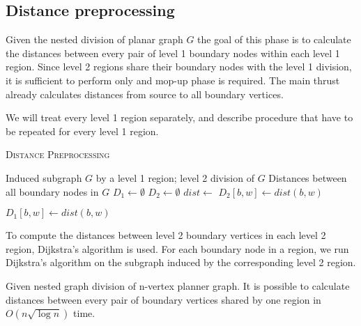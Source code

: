 \subsection{Distance preprocessing}
Given the nested division of planar graph $G$ the goal of this phase is to calculate the distances between every pair of level 1 boundary nodes within each level 1 region. Since level 2 regions share their boundary nodes with the level 1 division, it is sufficient to perform only  and mop-up phase is required. The main thrust already calculates distances from source to all boundary vertices.

We will treat every level 1 region separately, and describe procedure that have to be repeated for every level 1 region.

\begin{algorithm}
\caption{\textsc{Distance Preprocessing}}\label{distacenPrepro}
\begin{algorithmic}[1]
\Require Induced subgraph $G$ by a level 1 region; level 2 division of $G$
\Ensure Distances between all boundary nodes in $G$
\State $D_1 \gets \emptyset$ 
\State $D_2 \gets \emptyset$ 
        \State $dist \gets$ 
            \State $D_2[b,w] \gets dist(b, w)$
        \EndFor
    \EndFor
\EndFor

    \State {}
        \State $D_1[b,w] \gets dist(b, w)$
    \EndFor
\EndFor
\State {}
\EndProcedure
\end{algorithmic}
\end{algorithm}

To compute the distances between level 2 boundary vertices in each level 2 region, Dijkstra's algorithm is used. For each boundary node in a region, we run Dijkstra's algorithm on the subgraph induced by the corresponding level 2 region.

\begin{lemma}
Given nested graph division of n-vertex planner graph. It is possible to calculate distances between every pair of boundary vertices shared by one region in $O(n \sqrt{\log n})$ time.
\end{lemma}


